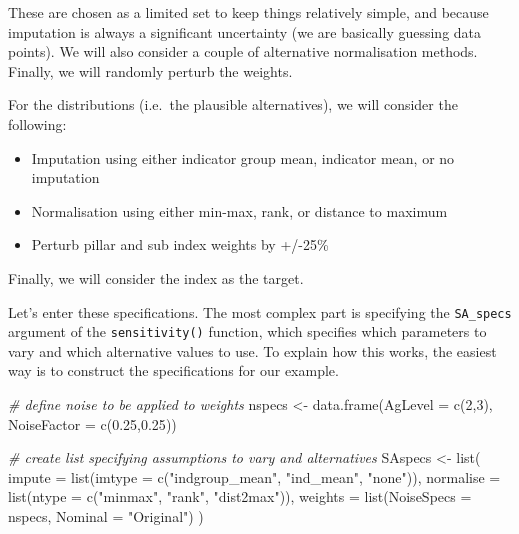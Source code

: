 \documentclass[
]{book}
\newenvironment{Shaded}{\begin{snugshade}}{\end{snugshade}}
\newcommand{\AttributeTok}[1]{\textcolor[rgb]{0.77,0.63,0.00}{#1}}
\newcommand{\CommentTok}[1]{\textcolor[rgb]{0.56,0.35,0.01}{\textit{#1}}}
\newcommand{\DecValTok}[1]{\textcolor[rgb]{0.00,0.00,0.81}{#1}}
\newcommand{\FloatTok}[1]{\textcolor[rgb]{0.00,0.00,0.81}{#1}}
\newcommand{\FunctionTok}[1]{\textcolor[rgb]{0.00,0.00,0.00}{#1}}
\newcommand{\NormalTok}[1]{#1}
\newcommand{\OtherTok}[1]{\textcolor[rgb]{0.56,0.35,0.01}{#1}}
\newcommand{\StringTok}[1]{\textcolor[rgb]{0.31,0.60,0.02}{#1}}
\providecommand{\tightlist}{%
  \setlength{\itemsep}{0pt}\setlength{\parskip}{0pt}}
\begin{document}
These are chosen as a limited set to keep things relatively simple, and because imputation is always a significant uncertainty (we are basically guessing data points). We will also consider a couple of alternative normalisation methods. Finally, we will randomly perturb the weights.

For the distributions (i.e.~the plausible alternatives), we will consider the following:

\begin{itemize}
\tightlist
\item
  Imputation using either indicator group mean, indicator mean, or no imputation
\item
  Normalisation using either min-max, rank, or distance to maximum
\item
  Perturb pillar and sub index weights by +/-25\%
\end{itemize}

Finally, we will consider the index as the target.

Let's enter these specifications. The most complex part is specifying the \texttt{SA\_specs} argument of the \texttt{sensitivity()} function, which specifies which parameters to vary and which alternative values to use. To explain how this works, the easiest way is to construct the specifications for our example.

\begin{Shaded}
\begin{Highlighting}[]
\CommentTok{\# define noise to be applied to weights}
\NormalTok{nspecs }\OtherTok{\textless{}{-}} \FunctionTok{data.frame}\NormalTok{(}\AttributeTok{AgLevel =} \FunctionTok{c}\NormalTok{(}\DecValTok{2}\NormalTok{,}\DecValTok{3}\NormalTok{), }\AttributeTok{NoiseFactor =} \FunctionTok{c}\NormalTok{(}\FloatTok{0.25}\NormalTok{,}\FloatTok{0.25}\NormalTok{))}

\CommentTok{\# create list specifying assumptions to vary and alternatives}
\NormalTok{SAspecs }\OtherTok{\textless{}{-}} \FunctionTok{list}\NormalTok{(}
  \AttributeTok{impute =} \FunctionTok{list}\NormalTok{(}\AttributeTok{imtype =} \FunctionTok{c}\NormalTok{(}\StringTok{"indgroup\_mean"}\NormalTok{, }\StringTok{"ind\_mean"}\NormalTok{, }\StringTok{"none"}\NormalTok{)),}
  \AttributeTok{normalise =} \FunctionTok{list}\NormalTok{(}\AttributeTok{ntype =} \FunctionTok{c}\NormalTok{(}\StringTok{"minmax"}\NormalTok{, }\StringTok{"rank"}\NormalTok{, }\StringTok{"dist2max"}\NormalTok{)),}
  \AttributeTok{weights =} \FunctionTok{list}\NormalTok{(}\AttributeTok{NoiseSpecs =}\NormalTok{ nspecs, }\AttributeTok{Nominal =} \StringTok{"Original"}\NormalTok{)}
\NormalTok{)}
\end{Highlighting}
\end{Shaded}
\end{document}
